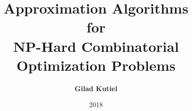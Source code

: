 \title{
Approximation Algorithms 
\\
for
\\
NP-Hard Combinatorial Optimization Problems
}
\author[shortname]{
    \textbf{Gilad Kutiel}
}
\date{2018}

